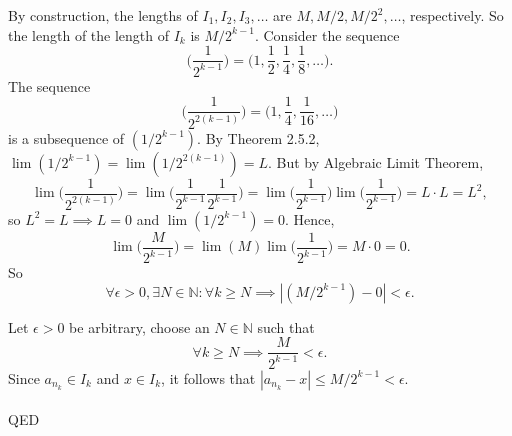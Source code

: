 \documentclass{article}
\begin{document}
                By construction, the lengths of $I_1,I_2,I_3,\dots$ are $M,M/2,M/2^2,\dots$, respectively. So the length of the length of $I_k$ is $M/2^{k-1}$. Consider the sequence
                \begin{equation*}
                    \bigg(\frac{1}{2^{k-1}}\bigg) = \bigg(1, \frac{1}{2}, \frac{1}{4}, \frac{1}{8}, \dots\bigg).
                \end{equation*}
                The sequence 
                \begin{equation*}
                    \bigg(\frac{1}{2^{2(k-1)}}\bigg) = \bigg(1, \frac{1}{4}, \frac{1}{16}, \dots\bigg)
                \end{equation*}
                is a subsequence of $(1/2^{k-1})$. By Theorem 2.5.2, $\lim(1/2^{k-1})=\lim(1/2^{2(k-1)})=L$. But by Algebraic Limit Theorem, 
                \begin{equation*}
                    \lim\bigg(\frac{1}{2^{2(k-1)}}\bigg) = \lim\bigg(\frac{1}{2^{k-1}}\frac{1}{2^{k-1}}\bigg) = \lim\bigg(\frac{1}{2^{k-1}}\bigg)\lim\bigg(\frac{1}{2^{k-1}}\bigg) = L \cdot L = L^2,
                \end{equation*}
                so $L^2 = L \implies L=0$ and $\lim(1/2^{k-1})=0$. Hence,
                \begin{equation*}
                    \lim\bigg(\frac{M}{2^{k-1}}\bigg)=\lim(M)\lim\bigg(\frac{1}{2^{k-1}}\bigg)=M\cdot 0=0.
                \end{equation*}
                So 
                \begin{equation*}
                    \forall \epsilon > 0, \exists N \in \mathbb{N}: \forall k \geq N \implies |(M/2^{k-1})-0|<\epsilon.
                \end{equation*}
                
                Let $\epsilon>0$ be arbitrary, choose an $N \in \mathbb{N}$ such that
                \begin{equation*}
                    \forall k \geq N \implies \frac{M}{2^{k-1}} < \epsilon.
                \end{equation*}
                Since $a_{n_k} \in I_k$ and $x \in I_k$, it follows that $|a_{n_k} - x| \leq M/2^{k-1} <\epsilon$.\\ \\
                QED
            
\end{document}
